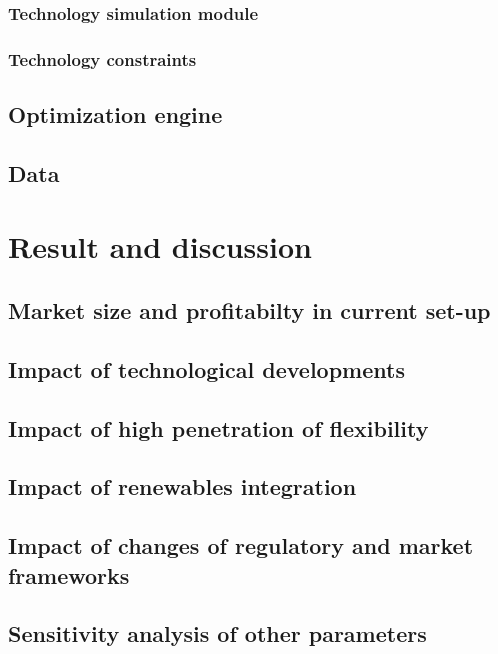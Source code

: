 \documentclass[a4paper,11pt,twoside,onecolumn]{book}
\begin{document}
\subsection{Technology simulation module}

\subsection{Technology constraints}

\section{Optimization engine}

\section{Data}


\chapter{Result and discussion}
\label{CaseStudy}

\section{Market size and profitabilty in current set-up}

\section{Impact of technological developments}

\section{Impact of high penetration of flexibility}

\section{Impact of renewables integration}

\section{Impact of changes of regulatory and market frameworks}

\section{Sensitivity analysis of other parameters}
\end{document}
